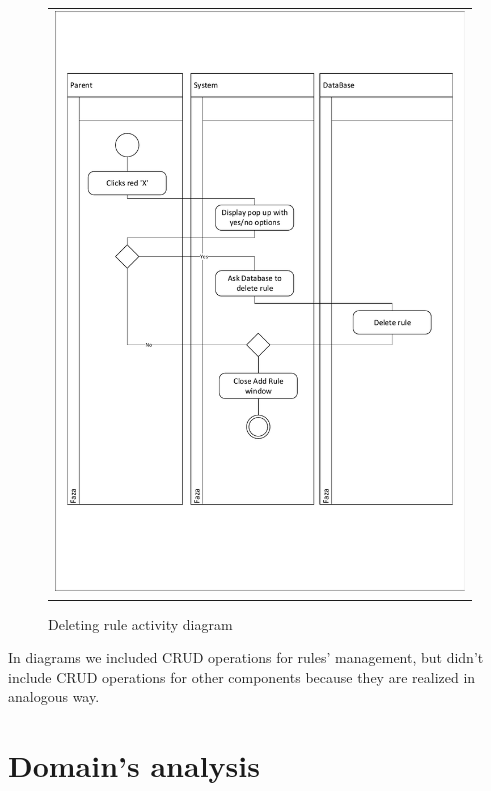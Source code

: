 \documentclass{sprawozdanie-agh}
\begin{document}
			\begin{figure}[H]
				\centering
				\begin{tabular}{c}
					\includegraphics[width=.95\textwidth]{crudDelete_cropped} 
				\end{tabular}
			\caption{Deleting rule activity diagram}
			\end{figure}


			In diagrams we included CRUD operations for rules' management, but didn't include CRUD operations for other components because they are realized in analogous way.

	\section{Domain's analysis}
\end{document}
